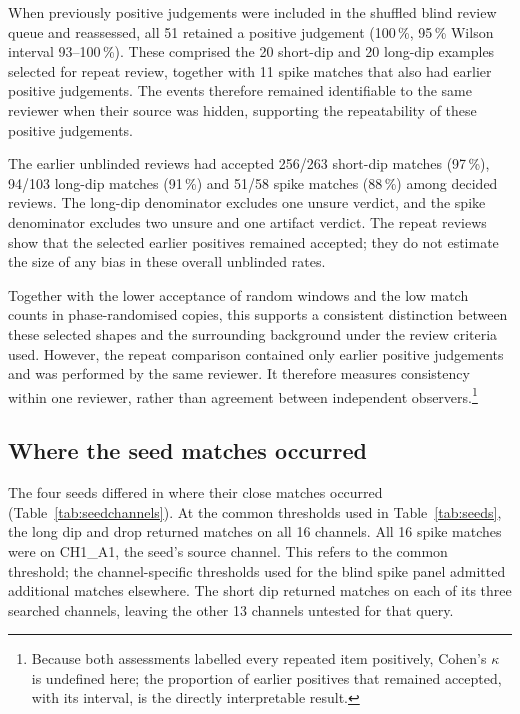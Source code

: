 When previously positive judgements were included in the shuffled blind review queue and reassessed, all 51 retained a positive judgement (100\,\%, 95\,\% Wilson interval 93--100\,\%). These comprised the 20 short-dip and 20 long-dip examples selected for repeat review, together with 11 spike matches that also had earlier positive judgements. The events therefore remained identifiable to the same reviewer when their source was hidden, supporting the repeatability of these positive judgements.

The earlier unblinded reviews had accepted 256/263 short-dip matches (97\,\%), 94/103 long-dip matches (91\,\%) and 51/58 spike matches (88\,\%) among decided reviews. The long-dip denominator excludes one unsure verdict, and the spike denominator excludes two unsure and one artifact verdict. The repeat reviews show that the selected earlier positives remained accepted; they do not estimate the size of any bias in these overall unblinded rates.

Together with the lower acceptance of random windows and the low match counts in phase-randomised copies, this supports a consistent distinction between these selected shapes and the surrounding background under the review criteria used. However, the repeat comparison contained only earlier positive judgements and was performed by the same reviewer. It therefore measures consistency within one reviewer, rather than agreement between independent observers.\footnote{Because both assessments labelled every repeated item positively, Cohen's $\kappa$ is undefined here; the proportion of earlier positives that remained accepted, with its interval, is the directly interpretable result.}


\subsection{Where the seed matches occurred}
\label{sec:seedchannels}

The four seeds differed in where their close matches occurred (Table~\ref{tab:seedchannels}). At the common thresholds used in Table~\ref{tab:seeds}, the long dip and drop returned matches on all 16 channels. All 16 spike matches were on CH1\_A1, the seed's source channel. This refers to the common threshold; the channel-specific thresholds used for the blind spike panel admitted additional matches elsewhere. The short dip returned matches on each of its three searched channels, leaving the other 13 channels untested for that query.

